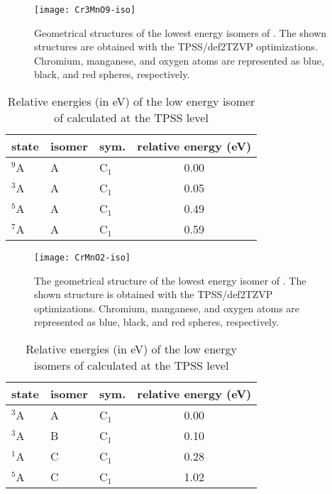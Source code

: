 \begin{figure}
	\centering
	\texttt{[image: Cr3MnO9-iso]}
	\caption{Geometrical structures of the lowest energy isomers of . The shown structures are obtained with the TPSS/def2TZVP optimizations. Chromium, manganese, and oxygen atoms are represented as blue, black, and red spheres, respectively.}
	\label{figs:Cr3MnO9}
\end{figure}



\FloatBarrier


\begin{table}[]
	\centering
\caption{Relative energies (in eV) of the low energy isomer of  calculated at the TPSS level}
\begin{tabular}{@{}lllc@{}}
\toprule
state 	 & isomer & sym. 	& relative energy (eV) \\ \midrule
$^9$A    & A      & C$_1$   & 0.00                 \\
$^3$A    & A      & C$_1$   & 0.05                 \\
$^5$A    & A      & C$_1$   & 0.49                 \\
$^7$A    & A      & C$_1$   & 0.59                 \\ \bottomrule
\end{tabular}
\end{table}
	




\begin{figure}
	\centering
	\texttt{[image: CrMnO2-iso]}
	\caption{The geometrical structure of the lowest energy isomer of . The shown structure is obtained with the TPSS/def2TZVP optimizations. Chromium, manganese, and oxygen atoms are represented as blue, black, and red spheres, respectively.}
	\label{figs:CrMnO2}
\end{figure}




\begin{table}[]
	\centering
	\caption{Relative energies (in eV) of the low energy isomers of  calculated at the TPSS level}
	\begin{tabular}{@{}lllc@{}}
	\toprule
	state 	 & isomer & sym. 	& relative energy (eV) \\ \midrule
	$^3$A    & A      & C$_1$   & 0.00                 \\
	$^3$A    & B      & C$_1$   & 0.10                 \\
	$^1$A    & C      & C$_1$   & 0.28                 \\
	$^5$A    & C      & C$_1$   & 1.02                 \\ \bottomrule
	\end{tabular}
\end{table}
		


